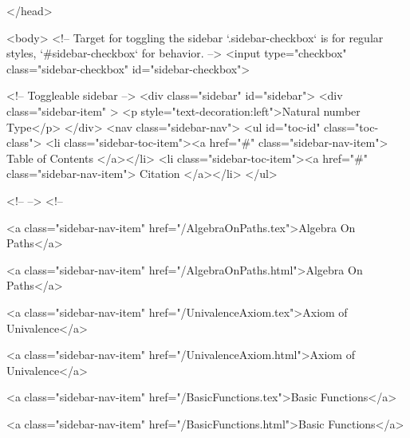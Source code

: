   
</head>




  <body>
    <!-- Target for toggling the sidebar `.sidebar-checkbox` is for regular
     styles, `#sidebar-checkbox` for behavior. -->
<input type="checkbox" class="sidebar-checkbox" id="sidebar-checkbox">

<!-- Toggleable sidebar -->
<div class="sidebar" id="sidebar">
  <div class="sidebar-item" >
    <p style="text-decoration:left">Natural number Type</p>
  </div>
  <nav class="sidebar-nav">
    <ul id="toc-id" class="toc-class">
  <li class="sidebar-toc-item"><a href="#" class="sidebar-nav-item"> Table of Contents </a></li>
  <li class="sidebar-toc-item"><a href="#" class="sidebar-nav-item"> Citation </a></li>
</ul>


    <!--  -->
    <!-- 
      
    
      
    
      
    
      
        
      
    
      
        
          <a class="sidebar-nav-item" href="/AlgebraOnPaths.tex">Algebra On Paths</a>
        
      
    
      
        
          <a class="sidebar-nav-item" href="/AlgebraOnPaths.html">Algebra On Paths</a>
        
      
    
      
        
          <a class="sidebar-nav-item" href="/UnivalenceAxiom.tex">Axiom of Univalence</a>
        
      
    
      
        
          <a class="sidebar-nav-item" href="/UnivalenceAxiom.html">Axiom of Univalence</a>
        
      
    
      
        
          <a class="sidebar-nav-item" href="/BasicFunctions.tex">Basic Functions</a>
        
      
    
      
        
          <a class="sidebar-nav-item" href="/BasicFunctions.html">Basic Functions</a>
        
      
    
      
        
